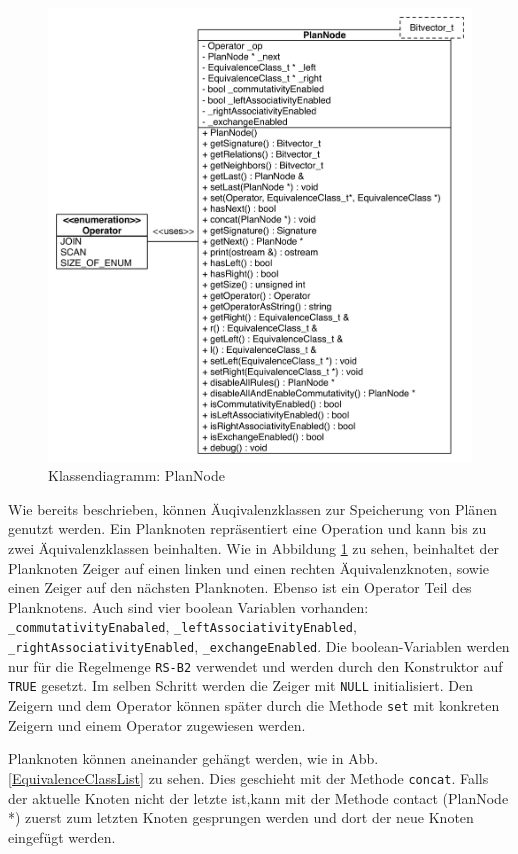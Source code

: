 \begin{figure}[ht]
  \centering
  \includegraphics[width=\textwidth]{04_Implementierung/00_media/PlanNodeClass.pdf}
  \caption{Klassendiagramm: PlanNode}
  \label{PlanNodeClass}
\end{figure}

Wie bereits beschrieben, können Äuqivalenzklassen zur Speicherung von Plänen genutzt werden. Ein Planknoten repräsentiert eine Operation und kann bis zu zwei Äquivalenzklassen beinhalten. Wie in Abbildung \ref{PlanNodeClass} zu sehen, beinhaltet der Planknoten Zeiger auf einen linken und einen rechten Äquivalenzknoten, sowie einen Zeiger auf den nächsten Planknoten. Ebenso ist ein Operator Teil des Planknotens. Auch sind vier boolean Variablen vorhanden: \texttt{\_commutativity\-Enabaled}, \texttt{\_left\-Associativity\-Enabled},  \texttt{\_right\-Associativity\-Enabled},  \texttt{\_exchange\-Enabled}. Die boolean-Variablen werden nur für die Regelmenge \texttt{RS-B2} verwendet und werden durch den Konstruktor auf \texttt{TRUE} gesetzt. Im selben Schritt werden die Zeiger mit \texttt{NULL} initialisiert. Den Zeigern und dem Operator können später durch die Methode \texttt{set} mit konkreten Zeigern und einem Operator zugewiesen werden.

Planknoten können aneinander gehängt werden, wie in Abb. \ref{EquivalenceClassList} zu sehen. Dies geschieht mit der Methode \texttt{concat}. Falls der aktuelle Knoten nicht der letzte ist,kann mit der Methode contact (PlanNode *) zuerst zum letzten Knoten gesprungen werden und dort der neue Knoten eingefügt werden. 

